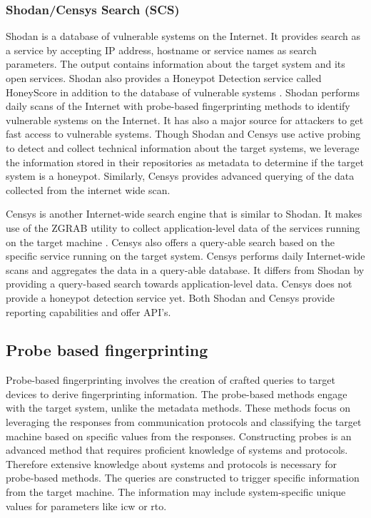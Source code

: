 \subsubsection{Shodan/Censys Search (SCS)}
Shodan is a database of vulnerable systems on the Internet. It provides search as a service by accepting IP address, hostname or service names as search parameters. The output contains information about the target system and its open services. Shodan also provides a Honeypot Detection service called HoneyScore  in addition to the database of vulnerable systems \cite{SHODAN}. Shodan performs daily scans of the Internet with probe-based fingerprinting methods to identify vulnerable systems on the Internet. It has also a major source for attackers to get fast access to vulnerable systems. Though Shodan and Censys use active probing to detect and collect technical information about the target systems, we leverage the information stored in their repositories as metadata to determine if the target system is a honeypot. Similarly, Censys provides advanced querying of the data collected from the internet wide scan. 

Censys is another Internet-wide search engine that is similar to Shodan. It makes use of the ZGRAB  utility to collect application-level data of the services running on the target machine \cite{censys}. Censys also offers a query-able search based on the specific service running on the target system. Censys performs daily Internet-wide scans and aggregates the data in a query-able database. It differs from Shodan by providing a query-based search towards application-level data. Censys does not provide a honeypot detection service yet. Both Shodan and Censys provide reporting capabilities and offer API's. 

\subsection{Probe based fingerprinting}
\label{Probe Based}
Probe-based fingerprinting involves the creation of crafted queries to target devices to derive fingerprinting information. The probe-based methods engage with the target system, unlike the metadata methods. These methods focus on leveraging the responses from communication protocols and classifying the target machine based on specific values from the responses. Constructing probes is an advanced method that requires proficient knowledge of systems and protocols. Therefore extensive knowledge about systems and protocols is necessary for probe-based methods. The queries are constructed to trigger specific information from the target machine. The information may include system-specific unique values for parameters like \acrfull{icw} or \acrfull{rto}. 

